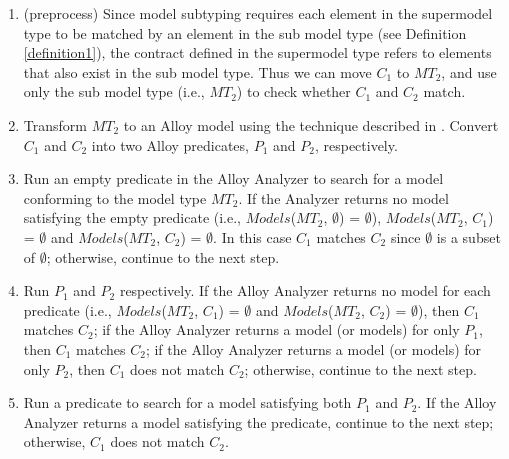 \begin{enumerate}
\item (preprocess) Since model subtyping requires each element in the supermodel type to be matched by an element in the sub model type (see Definition \ref{definition1}), the contract defined in the supermodel type refers to elements that also exist in the sub model type. 
Thus we can move $C_1$ to $MT_2$, and use only the sub model type (i.e., $MT_2$) to check whether $C_1$ and $C_2$ match.

\item Transform $MT_2$ to an Alloy model using the technique described in \cite{sun2011rigorous}. 
Convert $C_1$ and $C_2$ into two Alloy predicates, $P_1$ and $P_2$, respectively.  

\item Run an empty predicate in the Alloy Analyzer to search for a model conforming to the model type $MT_2$. 
If the Analyzer returns no model satisfying the empty predicate (i.e., $Models$($MT_2$, $\emptyset$) = $\emptyset$), $Models$($MT_2$, $C_1$) = $\emptyset$ and $Models$($MT_2$, $C_2$) = $\emptyset$. In this case $C_1$ matches $C_2$ since $\emptyset$ is a subset of $\emptyset$; otherwise, continue to the next step.  

\item Run $P_1$ and $P_2$ respectively. 
If the Alloy Analyzer returns no model for each predicate (i.e., $Models$($MT_2$, $C_1$) = $\emptyset$ and $Models$($MT_2$, $C_2$) = $\emptyset$), then $C_1$ matches $C_2$; if the Alloy Analyzer returns a model (or models) for only $P_1$, then $C_1$ matches $C_2$; if the Alloy Analyzer returns a model (or models) for only $P_2$, then $C_1$ does not match $C_2$; otherwise, continue to the next step.

\item Run a predicate to search for a model satisfying both $P_1$ and $P_2$. 
If the Alloy Analyzer returns a model satisfying the predicate, continue to the next step; otherwise, $C_1$ does not match $C_2$.


\end{enumerate}

